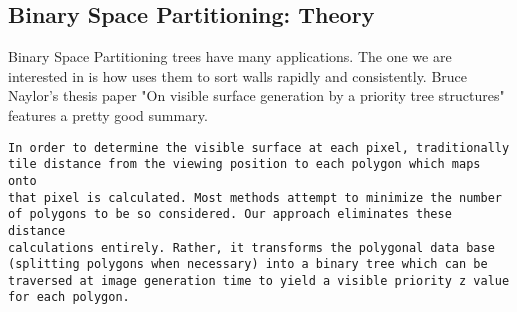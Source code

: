 \pagebreak

\subsection{Binary Space Partitioning: Theory} \label{Binary Space Partitioning: Theory}
Binary Space Partitioning trees have many applications. The one we are interested in is how \doom{} uses them to sort walls rapidly and consistently. Bruce Naylor's thesis paper "On visible surface generation by a priority tree structures" features a pretty good summary.\\

 \begin{verbatim}
In order to determine the visible surface at each pixel, traditionally
tile distance from the viewing position to each polygon which maps onto 
that pixel is calculated. Most methods attempt to minimize the number 
of polygons to be so considered. Our approach eliminates these distance
calculations entirely. Rather, it transforms the polygonal data base 
(splitting polygons when necessary) into a binary tree which can be 
traversed at image generation time to yield a visible priority z value
for each polygon.
\end{verbatim}

